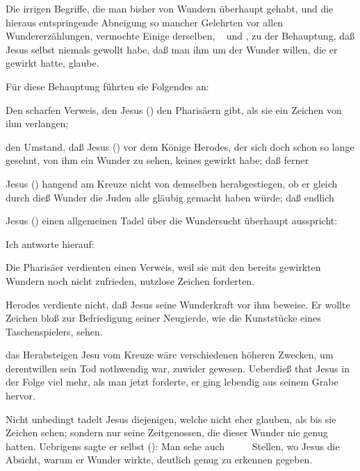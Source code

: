 \begin{aufza}
\item Die irrigen Begriffe, die man bisher von Wundern überhaupt gehabt, und die hieraus entspringende Abneigung so mancher Gelehrten vor allen Wundererzählungen, vermochte Einige derselben, \zB\  und , zu der Behauptung, daß Jesus selbst niemals gewollt habe, daß man ihm um der Wunder willen, die er gewirkt hatte, glaube.
\end{aufza}\par
Für diese Behauptung führten sie Folgendes an:
\begin{aufzb}
\item Den scharfen Verweis, den Jesus () den Pharisäern gibt, als sie ein Zeichen von ihm verlangen;
\item den Umstand, daß Jesus () vor dem Könige Herodes, der sich doch schon so lange gesehnt, von ihm ein Wunder zu sehen, keines gewirkt habe; daß ferner
\item Jesus () hangend am Kreuze nicht von demselben herabgestiegen, ob er gleich durch dieß Wunder die Juden alle gläubig gemacht haben würde; daß endlich
\item Jesus () einen allgemeinen Tadel über die Wundersucht überhaupt ausspricht: 
\end{aufzb}
Ich antworte hierauf:
\begin{aufzb}
\item Die Pharisäer verdienten einen Verweis, weil sie mit den bereits gewirkten Wundern noch nicht zufrieden, nutzlose Zeichen  forderten.
\item Herodes verdiente nicht, daß Jesus seine Wunderkraft vor ihm beweise. Er wollte Zeichen bloß zur Befriedigung seiner Neugierde, wie die Kunststücke eines Taschenspielers, sehen.
\item das Herabsteigen Jesu vom Kreuze wäre verschiedenen höheren Zwecken, um derentwillen sein Tod nothwendig war, zuwider gewesen. Ueberdieß that Jesus in der Folge viel mehr, als man jetzt forderte, er ging lebendig aus seinem Grabe hervor.~
\item Nicht unbedingt tadelt Jesus diejenigen, welche nicht eher glauben, als bis sie Zeichen sehen; sondern nur seine Zeitgenossen, die dieser Wunder nie genug hatten. Uebrigens sagte er selbst ():  Man sehe auch \ \ \ \ \uma\  Stellen, wo Jesus die Absicht, warum er Wunder wirkte, deutlich genug zu erkennen gegeben.
\end{aufzb}
